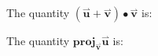 \documentclass{ximera}
\begin{document}
\begin{exercise}
The quantity $(\overset{\boldsymbol{\rightharpoonup}}{\mathbf{u}} + \overset{\boldsymbol{\rightharpoonup}}{\mathbf{v}}) \bullet  \overset{\boldsymbol{\rightharpoonup}}{\mathbf{v}}$ is:
\begin{multipleChoice}
\end{multipleChoice}


The quantity $\mathbf{proj}_{\overset{\boldsymbol{\rightharpoonup}}{\mathbf{v}}} \overset{\boldsymbol{\rightharpoonup}}{\mathbf{u}}$ is:

\begin{multipleChoice}
\end{multipleChoice}





\end{exercise}
\end{document}
